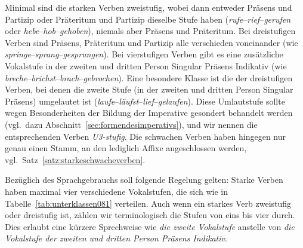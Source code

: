 Minimal sind die starken Verben zweistufig, wobei dann entweder Präsens und Partizip oder Präteritum und Partizip dieselbe Stufe haben (\textit{rufe}--\textit{rief}--\textit{gerufen} oder \textit{hebe}--\textit{hob}--\textit{gehoben}), niemals aber Präsens und Präteritum.
Bei dreistufigen Verben sind Präsens, Präteritum und Partizip alle verschieden voneinander (wie \textit{springe}--\textit{sprang}--\textit{gesprungen}).
Bei vierstufigen Verben gibt es eine zusätzliche Vokalstufe in der zweiten und dritten Person Singular Präsens Indikativ (wie \textit{breche}--\textit{brichst}--\textit{brach}--\textit{gebrochen}).
Eine besondere Klasse ist die der dreistufigen Verben, bei denen die zweite Stufe (in der zweiten und dritten Person Singular Präsens) umgelautet ist (\textit{laufe}--\textit{läufst}--\textit{lief}--\textit{gelaufen}).
Diese Umlautstufe sollte wegen Besonderheiten der Bildung der Imperative gesondert behandelt werden (vgl.\ dazu Abschnitt~\ref{sec:formendesimperativs}), und wir nennen die entsprechenden Verben \textit{U3-stufig}.
Die schwachen Verben haben hingegen nur genau einen Stamm, an den lediglich Affixe angeschlossen werden, vgl.\ Satz~\ref{satz:starkeschwacheverben}.


\Stretch


\Np

Bezüglich des Sprachgebrauchs soll folgende Regelung gelten:
Starke Verben haben maximal vier verschiedene Vokalstufen, die sich wie in Tabelle~\ref{tab:unterklassen081} verteilen.
Auch wenn ein starkes Verb zweistufig oder dreistufig ist, zählen wir terminologisch die Stufen von eins bis vier durch.
Dies erlaubt eine kürzere Sprechweise wie \textit{die zweite Vokalstufe} anstelle von \textit{die Vokalstufe der zweiten und dritten Person Präsens Indikativ}.

